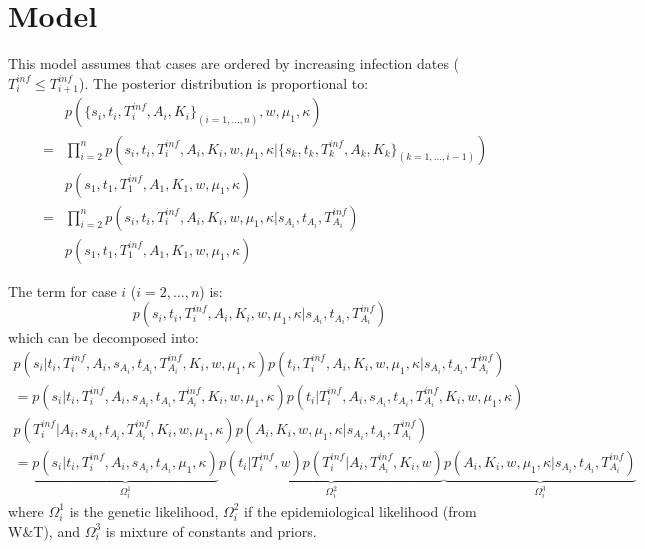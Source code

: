 \documentclass[10pt]{article}
\begin{document}
\section*{Model}
This model assumes that cases are ordered by increasing infection dates ($T_i^{inf} \leq T_{i+1}^{inf}$).
The posterior distribution is proportional to:
\begin{eqnarray}
& & p(\{s_i, t_i, T_i^{inf}, A_i, K_i\}_{(i=1,\ldots,n)}, w, \mu_1, \kappa)\\
& = & \prod_{i=2}^n p(s_i, t_i, T_i^{inf}, A_i, K_i, w, \mu_1, \kappa | \{s_k, t_k, T_k^{inf}, A_k, K_k\}_{(k=1,\ldots,i-1)}) \nonumber \\ 
& & p(s_1, t_1, T_1^{inf}, A_1, K_1, w, \mu_1, \kappa)\\
& = & \prod_{i=2}^n p(s_i, t_i, T_i^{inf}, A_i, K_i, w, \mu_1, \kappa | s_{A_i}, t_{A_i}, T_{A_i}^{inf}) \nonumber \\
& & p(s_1, t_1, T_1^{inf}, A_1, K_1, w, \mu_1, \kappa)
\end{eqnarray}



The term for case $i$ ($i=2,\ldots,n$) is:
\begin{equation}
 p(s_i, t_i, T_i^{inf}, A_i, K_i, w, \mu_1, \kappa | s_{A_i}, t_{A_i}, T_{A_i}^{inf})
\end{equation}
which can be decomposed into:
\begin{eqnarray}
p(s_i | t_i, T_i^{inf}, A_i, s_{A_i}, t_{A_i}, T_{A_i}^{inf}, K_i, w, \mu_1, \kappa)  
p(t_i, T_i^{inf}, A_i, K_i, w, \mu_1, \kappa | s_{A_i}, t_{A_i}, T_{A_i}^{inf}) & \nonumber  \\
= p(s_i | t_i, T_i^{inf}, A_i, s_{A_i}, t_{A_i}, T_{A_i}^{inf}, K_i, w, \mu_1, \kappa)
  p(t_i | T_i^{inf}, A_i, s_{A_i}, t_{A_i}, T_{A_i}^{inf}, K_i, w, \mu_1, \kappa) & \nonumber \\
  p(T_i^{inf} | A_i, s_{A_i}, t_{A_i}, T_{A_i}^{inf}, K_i, w, \mu_1, \kappa)
    p(A_i, K_i, w, \mu_1, \kappa | s_{A_i}, t_{A_i}, T_{A_i}^{inf}) & \nonumber \\
= \underbrace{p(s_i | t_i, T_i^{inf}, A_i, s_{A_i}, t_{A_i}, \mu_1, \kappa)}_{\Omega_i^1}  
    \underbrace{p(t_i | T_i^{inf}, w)
		p(T_i^{inf} | A_i, T_{A_i}^{inf}, K_i, w)}_{\Omega_i^2}
    \underbrace{p(A_i, K_i, w, \mu_1, \kappa | s_{A_i}, t_{A_i}, T_{A_i}^{inf})}_{\Omega_i^3} &
\end{eqnarray}
\noindent where $\Omega_i^1$ is the genetic likelihood, $\Omega_i^2$ if the epidemiological likelihood (from W\&T), and $\Omega_i^3$ is mixture of constants and priors.
\\
\end{document}
